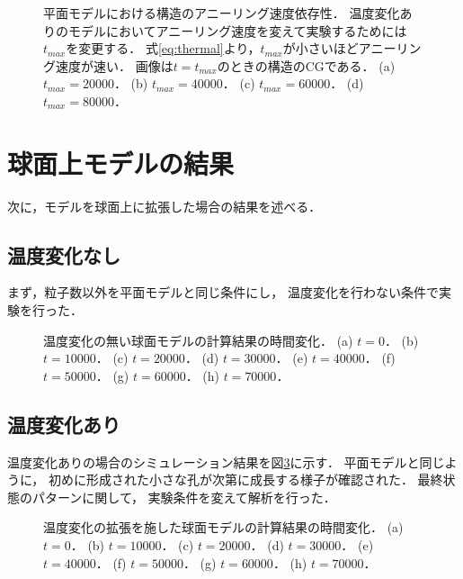 \begin{figure}
\centering

\caption{
    平面モデルにおける構造のアニーリング速度依存性．
    温度変化ありのモデルにおいてアニーリング速度を変えて実験するためには$t_{max}$を変更する．
    式\ref{eq:thermal}より，$t_{max}$が小さいほどアニーリング速度が速い．
    画像は$t=t_{max}$のときの構造のCGである．
    (a) $t_{max}=20000$．
    (b) $t_{max}=40000$．
    (c) $t_{max}=60000$．
    (d) $t_{max}=80000$．
}
\label{fig:result_2d_anearing_speed}
\end{figure}




\section{球面上モデルの結果}

次に，モデルを球面上に拡張した場合の結果を述べる．

\subsection{温度変化なし}

まず，粒子数以外を平面モデルと同じ条件にし，
温度変化を行わない条件で実験を行った．

\begin{figure}
\centering

\caption{
    温度変化の無い球面モデルの計算結果の時間変化．
    (a) $t=0$．
    (b) $t=10000$．
    (c) $t=20000$．
    (d) $t=30000$．
    (e) $t=40000$．
    (f) $t=50000$．
    (g) $t=60000$．
    (h) $t=70000$．
}
\label{fig:result_sphere_without_anearing}
\end{figure}


\subsection{温度変化あり}

温度変化ありの場合のシミュレーション結果を図\ref{fig:result_sphere_with_anearing}に示す．
平面モデルと同じように，
初めに形成された小さな孔が次第に成長する様子が確認された．
最終状態のパターンに関して，
実験条件を変えて解析を行った．

\begin{figure}
\centering

\caption{
    温度変化の拡張を施した球面モデルの計算結果の時間変化．
    (a) $t=0$．
    (b) $t=10000$．
    (c) $t=20000$．
    (d) $t=30000$．
    (e) $t=40000$．
    (f) $t=50000$．
    (g) $t=60000$．
    (h) $t=70000$．
}
\label{fig:result_sphere_with_anearing}
\end{figure}

